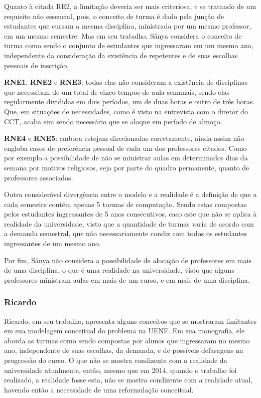            Quanto à citada RE2, a limitação deveria ser mais criteriosa, e se tratando de um requisito não essencial, pois, o conceito de turma é dado pela junção de estudantes que cursam a mesma disciplina, ministrada por um mesmo professor, em um mesmo semestre. Mas em seu trabalho, Sânya considera o conceito de turma como sendo o conjunto de estudantes que ingressaram em um mesmo ano, independente da consideração da existência de repetentes e de suas escolhas pessoais de inscrição.

            \textbf{RNE1}, \textbf{RNE2} e \textbf{RNE3}: todas elas não consideram a existência de disciplinas que necessitam de um total de cinco tempos de aula semanais, sendo elas regularmente divididas em dois períodos, um de duas horas e outro de três horas. Que, em situações de necessidades, como é visto na entrevista com o diretor do CCT, acaba sim sendo necessário que se aloque em período de almoço.

            \textbf{RNE4} e \textbf{RNE5}: embora estejam direcionadas corretamente, ainda assim não engloba casos de preferência pessoal de cada um dos professores citados. Como por exemplo a possibilidade de não se ministrar aulas em determinados dias da semana por motivos religiosos, seja por parte do quadro permanente, quanto de professores associados.

            Outra considerável divergência entre o modelo e a realidade é a definição de que a cada semestre contém apenas 5 turmas de computação. Sendo estas compostas pelos estudantes ingressantes de 5 anos consecutivos, caso este que não se aplica à realidade da universidade, visto que a quantidade de turmas varia de acordo com a demanda semestral, que não necessariamente condiz com todos os estudantes ingressantes de um mesmo ano.

            Por fim, Sânya não considera a possibilidade de alocação de professores em mais de uma disciplina, o que é uma realidade na universidade, visto que alguns professores ministram aulas em mais de um curso, e em mais de uma disciplina.

        \subsubsection{Ricardo}

            Ricardo, em seu trabalho, apresenta alguns conceitos que se mostraram limitantes em sua modelagem conceitual do problema na UENF. Em sua monografia, ele aborda as turmas como sendo compostas por alunos que ingressaram no mesmo ano, independente de suas escolhas, da demanda, e de possíveis defasagens na progressão do curso. O que não se mostra condizente com a realidade da universidade atualmente, então, mesmo que em 2014, quando o trabalho foi realizado, a realidade fosse esta, não se mostra condizente com a realidade atual, havendo então a necessidade de uma reformulação conceitual.

